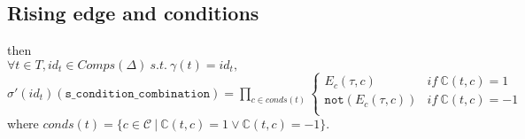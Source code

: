 \documentclass[dvipsnames,12pt]{article}
\begin{document}

\subsection{Rising edge and conditions}
\label{sec:re-cond-comb}

\begin{lemma}
  \label{lem:re-equal-cond-comb}
  \rehyps{} then\\
  $\forall{}t\in{}T,id_t\in{}Comps(\Delta)~s.t.~\gamma(t)=id_t,$\\
  $\sigma'(id_t)(\texttt{s\_condition\_combination})=
  \prod\limits_{c\in{}conds(t)}
  \begin{cases}
    E_c(\tau,c) & if~\mathbb{C}(t,c)=1 \\
    \mathtt{not}(E_c(\tau,c)) & if~\mathbb{C}(t,c)=-1 \\
  \end{cases}$\\
  where
  $conds(t)=\{c\in\mathcal{C}~\vert~\mathbb{C}(t,c)=1\lor\mathbb{C}(t,c)=-1\}$.
\end{lemma}
\end{document}
